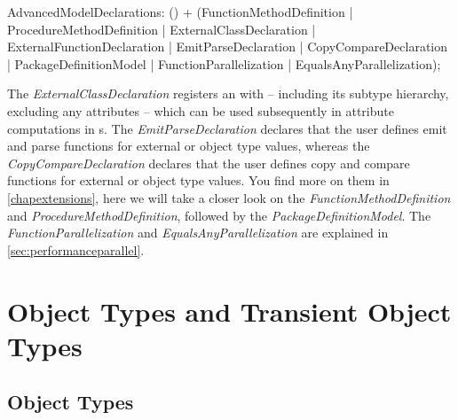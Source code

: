 \begin{rail}
  AdvancedModelDeclarations: () + (FunctionMethodDefinition
										 | ProcedureMethodDefinition
  									 | ExternalClassDeclaration
  									 | ExternalFunctionDeclaration
  									 | EmitParseDeclaration
  									 | CopyCompareDeclaration
										 | PackageDefinitionModel
										 | FunctionParallelization
										 | EqualsAnyParallelization);
\end{rail}

The \emph{ExternalClassDeclaration} registers an  with \GrG -- including its subtype hierarchy, excluding any attributes -- which can be used subsequently in attribute computations in s.
The \emph{EmitParseDeclaration} declares that the user defines emit and parse functions for external or object type values,
whereas the \emph{CopyCompareDeclaration} declares that the user defines copy and compare functions for external or object type values.
You find more on them in \ref{chapextensions}, here we will take a closer look on the \emph{FunctionMethodDefinition} and \emph{ProcedureMethodDefinition}, followed by the \emph{PackageDefinitionModel}.
The \emph{FunctionParallelization} and \emph{EqualsAnyParallelization} are explained in \ref{sec:performanceparallel}.



\section{Object Types and Transient Object Types}\label{sec:objecttypes}

\subsection{Object Types}

